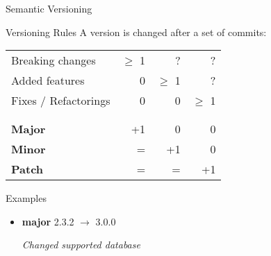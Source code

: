 \begin{frame}{Semantic Versioning}
\begin{fancycolumns}
		\nextcolumn
		\vspace{-5mm}
		\begin{note}{Versioning Rules }
			A version is changed after a set of commits:
			\begin{table}[]
				\begin{tabular}{lrrr}
					Breaking changes & $\geq$ 1 & ?        & ?      \\
					Added features  & 0        & $\geq$ 1 & ?   \\
					Fixes / Refactorings            & 0        & 0        & $\geq$ 1   \\[1mm]
					& \vspace{-4mm}& & \\[1mm]
					\hline
					& \vspace{-4mm}& & \\[1mm]
					\textbf{Major}                & +1       & 0        & 0         \\
					\textbf{Minor}                & =        & +1       & 0     \\
					\textbf{Patch}                & =        & =        & +1    
				\end{tabular}
			\end{table}
		\end{note}
		
		\begin{example}{Examples}
			
			\begin{itemize}
				
				\item \textbf{major} 2.3.2 $\rightarrow$ 3.0.0
				
				\textit{Changed supported database}
				

\end{itemize}
\end{example}
\end{fancycolumns}
\end{frame}
